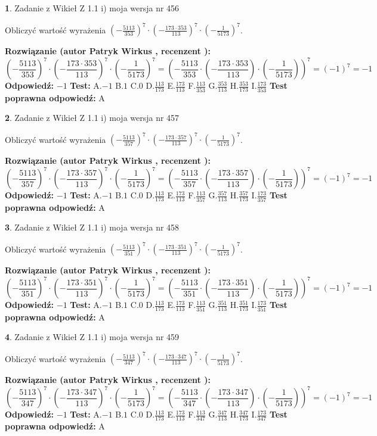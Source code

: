 \documentclass[12pt, a4paper]{article}
\theoremstyle{definition} %
\newtheorem{zad}{}
\newcommand{\zadStart}[1]{\begin{zad}#1\newline}
\newcommand{\zadStop}{\end{zad}}
\newcommand{\rozwStart}[2]{\noindent \textbf{Rozwiązanie (autor #1 , recenzent #2): }\newline}
\newcommand{\rozwStop}{\newline}
\newcommand{\odpStart}{\noindent \textbf{Odpowiedź:}\newline}
\newcommand{\odpStop}{\newline}
\newcommand{\testStart}{\noindent \textbf{Test:}\newline}
\newcommand{\testStop}{\newline}
\newcommand{\kluczStart}{\noindent \textbf{Test poprawna odpowiedź:}\newline}
\newcommand{\kluczStop}{\newline}
\begin{document}
\zadStart{Zadanie z Wikieł Z 1.1 i) moja wersja nr 456}

Obliczyć wartość wyrażenia $(-\frac{5113}{353})^{7} \cdot (-\frac{173 \cdot 353}{113})^{7} \cdot (-\frac{1}{5173})^{7}$.
\zadStop
\rozwStart{Patryk Wirkus}{}
$$(-\frac{5113}{353})^{7} \cdot (-\frac{173 \cdot 353}{113})^{7} \cdot (-\frac{1}{5173})^{7} = (-\frac{5113}{353} \cdot (-\frac{173 \cdot 353}{113}) \cdot (-\frac{1}{5173}))^{7} = (-1)^{7} = -1$$
\rozwStop
\odpStart
$-1$
\odpStop
\testStart
A.$-1$ B.$1$ C.$0$ D.$\frac{113}{173}$ E.$\frac{173}{113}$
F.$\frac{113}{353}$ G.$\frac{353}{113}$
H.$\frac{353}{173}$
I.$\frac{173}{353}$
\testStop
\kluczStart
A
\kluczStop



\zadStart{Zadanie z Wikieł Z 1.1 i) moja wersja nr 457}

Obliczyć wartość wyrażenia $(-\frac{5113}{357})^{7} \cdot (-\frac{173 \cdot 357}{113})^{7} \cdot (-\frac{1}{5173})^{7}$.
\zadStop
\rozwStart{Patryk Wirkus}{}
$$(-\frac{5113}{357})^{7} \cdot (-\frac{173 \cdot 357}{113})^{7} \cdot (-\frac{1}{5173})^{7} = (-\frac{5113}{357} \cdot (-\frac{173 \cdot 357}{113}) \cdot (-\frac{1}{5173}))^{7} = (-1)^{7} = -1$$
\rozwStop
\odpStart
$-1$
\odpStop
\testStart
A.$-1$ B.$1$ C.$0$ D.$\frac{113}{173}$ E.$\frac{173}{113}$
F.$\frac{113}{357}$ G.$\frac{357}{113}$
H.$\frac{357}{173}$
I.$\frac{173}{357}$
\testStop
\kluczStart
A
\kluczStop



\zadStart{Zadanie z Wikieł Z 1.1 i) moja wersja nr 458}

Obliczyć wartość wyrażenia $(-\frac{5113}{351})^{7} \cdot (-\frac{173 \cdot 351}{113})^{7} \cdot (-\frac{1}{5173})^{7}$.
\zadStop
\rozwStart{Patryk Wirkus}{}
$$(-\frac{5113}{351})^{7} \cdot (-\frac{173 \cdot 351}{113})^{7} \cdot (-\frac{1}{5173})^{7} = (-\frac{5113}{351} \cdot (-\frac{173 \cdot 351}{113}) \cdot (-\frac{1}{5173}))^{7} = (-1)^{7} = -1$$
\rozwStop
\odpStart
$-1$
\odpStop
\testStart
A.$-1$ B.$1$ C.$0$ D.$\frac{113}{173}$ E.$\frac{173}{113}$
F.$\frac{113}{351}$ G.$\frac{351}{113}$
H.$\frac{351}{173}$
I.$\frac{173}{351}$
\testStop
\kluczStart
A
\kluczStop



\zadStart{Zadanie z Wikieł Z 1.1 i) moja wersja nr 459}

Obliczyć wartość wyrażenia $(-\frac{5113}{347})^{7} \cdot (-\frac{173 \cdot 347}{113})^{7} \cdot (-\frac{1}{5173})^{7}$.
\zadStop
\rozwStart{Patryk Wirkus}{}
$$(-\frac{5113}{347})^{7} \cdot (-\frac{173 \cdot 347}{113})^{7} \cdot (-\frac{1}{5173})^{7} = (-\frac{5113}{347} \cdot (-\frac{173 \cdot 347}{113}) \cdot (-\frac{1}{5173}))^{7} = (-1)^{7} = -1$$
\rozwStop
\odpStart
$-1$
\odpStop
\testStart
A.$-1$ B.$1$ C.$0$ D.$\frac{113}{173}$ E.$\frac{173}{113}$
F.$\frac{113}{347}$ G.$\frac{347}{113}$
H.$\frac{347}{173}$
I.$\frac{173}{347}$
\testStop
\kluczStart
A
\kluczStop
\end{document}
